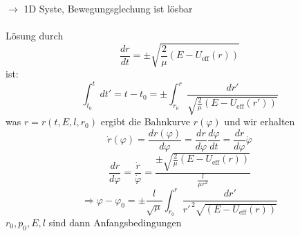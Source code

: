 \documentclass[titlepage,12pt,a4paper,ngerman]{report}
\newcommand{\tx}[1]{\textrm{#1}}
\newcommand{\intt}[2]{\int_{#1}^{#2}}
\begin{document}
{$\rightarrow$ 1D Syste, Bewegungsglechung ist lösbar\\\\
Lösung durch
$$\frac{dr}{dt} = \pm \sqrt{\frac{2}{\mu} (E-U_{\tx{eff}} (r))}$$
ist:
$$\intt{t_0}{t} dt' = t-t_0 = \pm \intt{r_0}{r} \frac{dr'}{\sqrt{\frac{2}{\mu} (E - U_{\tx{eff}} (r'))}}$$
was $r = r(t,E,l,r_0)$ ergibt die Bahnkurve $r(\varphi)$ und wir erhalten
$$\dot{r}(\varphi) = \frac{dr(\varphi)}{d\varphi} = \frac{dr}{d\varphi} \frac{d\varphi}{dt} = \frac{dr}{d\varphi} \dot{\varphi}$$
$$\frac{dr}{d\varphi} = \frac{\dot{r}}{\dot{\varphi}} =  \frac{\pm \sqrt{\frac{2}{\mu} (E - U_{\tx{eff}} (r))}}{\frac{l}{\mu r^2}} $$
$$ \Rightarrow \varphi - \varphi_0 = \pm \frac{l}{\sqrt{\mu}} \int_{r_0}^{r} \frac{dr'}{r'^{\,2} \sqrt{(E - U_{\tx{eff}} (r))}}$$
$ r_0, p_0, E, l $ sind dann Anfangsbedingungen



}
\end{document}
